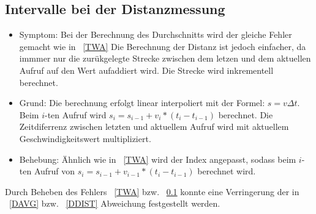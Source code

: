\documentclass[qualitaetssicherung.tex]{subfiles}
\begin{document}
	\subsection{Intervalle bei der Distanzmessung} \label{VGL}
		\begin{itemize}
			\item
			Symptom: Bei der Berechnung des Durchschnitts wird der gleiche Fehler gemacht wie in ~\ref{TWA} Die Berechnung der Distanz ist jedoch einfacher, da immmer nur die zurükgelegte Strecke zwischen dem letzen und dem aktuellen Aufruf auf den Wert aufaddiert wird. Die Strecke wird inkrementell berechnet.
			\item
			Grund: Die berechnung erfolgt linear interpoliert mit der Formel: $s=v\Delta t$. Beim $i$-ten Aufruf wird $s_{i} = s_{i-1} + v_i * (t_i - t_{i-1})$ berechnet. Die Zeitdiferrenz zwischen letzten und aktuellem Aufruf wird mit aktuellem Geschwindigkeitswert multipliziert.
			\item
			Behebung: Ähnlich wie in ~\ref{TWA} wird der Index angepasst, sodass beim $i$-ten Aufruf von  $s_{i} = s_{i-1} + v_{i-1} * (t_i - t_{i-1})$ berechnet wird.

		\end{itemize}

	Durch Beheben des Fehlers ~\ref{TWA} bzw. ~\ref{VGL} konnte eine Verringerung der in ~\ref{DAVG} bzw. ~\ref{DDIST} Abweichung festgestellt werden.
\end{document}
